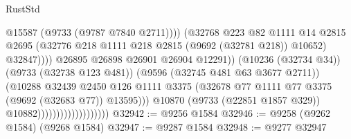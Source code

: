 \begin{lexlean}{RustStd}
\begin{coremodule}
                                                          @15587
                                                          (@9733 (@9787 @7840 @2711))))
                                                      (@32768
                                                        @223
                                                        @82
                                                        @1111
                                                        @14
                                                        @2815
                                                        @2695
                                                        (@32776
                                                          @218
                                                          @1111
                                                          @218
                                                          @2815
                                                          (@9692 (@32781 @218))
                                                          @10652)
                                                        @32847))))
                                                @26895
                                                @26898
                                                @26901
                                                @26904
                                                @12291))
                                            (@10236 (@32734 @34))
                                            (@9733 (@32738 @123 @481))
                                            (@9596 (@32745 @481 @63 @3677 @2711))
                                            (@10288
                                              @32439
                                              @2450
                                              @126
                                              @1111
                                              @3375
                                              (@32678
                                                @77
                                                @1111
                                                @77
                                                @3375
                                                (@9692 (@32683 @77))
                                                @13595)))
                                          @10870
                                          (@9733 (@22851 @1857 @329))
                                          @10882)))))))))))))))))))
@32942 := @9256 @1584
@32946 := @9258 (@9262 @1584) (@9268 @1584)
@32947 := @9287 @1584
@32948 := @9277 @32947

\end{coremodule}
\end{lexlean}
